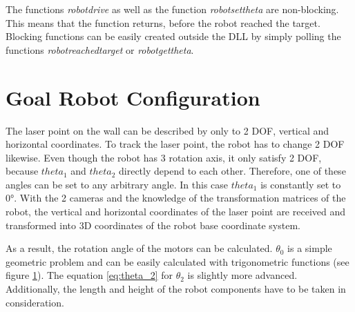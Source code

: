 \documentclass[./\jobname.tex]{subfiles}
\begin{document}
The functions \textit{robot\textunderscore drive} as well as the function \textit{robot\textunderscore set\textunderscore theta} are non-blocking. This means that the function returns, before the robot reached the target. Blocking functions can be easily created outside the DLL by simply polling the functions \textit{robot\textunderscore reached\textunderscore target} or \textit{robot\textunderscore get\textunderscore theta}.  



\section{Goal Robot Configuration}
\label{sec:calc_robot_config}

The laser point on the wall can be described by only to 2 DOF, vertical and horizontal coordinates. To track the laser point, the robot has to change 2 DOF likewise. Even though the robot has 3 rotation axis, it only satisfy 2 DOF, because $theta_1$ and $theta_2$ directly depend to each other. Therefore, one of these angles can be set to any arbitrary angle. In this case $theta_1$ is constantly set to 0°. With the 2 cameras and the knowledge of the transformation matrices of the robot, the vertical and horizontal coordinates of the laser point are received and transformed into 3D coordinates of the robot base coordinate system.

As a result, the rotation angle of the motors can be calculated. $\theta_0$ is a simple geometric problem and can be easily calculated with trigonometric functions (see figure \ref{fig:3d_point_base}). The equation \ref{eq:theta_2} for $\theta_2$ is slightly more advanced. Additionally, the length and height of the robot components have to be taken in consideration.

\begin{figure}[H]
	\centering
	\noindent{}
	\label{fig:3d_point_base}
\end{figure}
\end{document}
